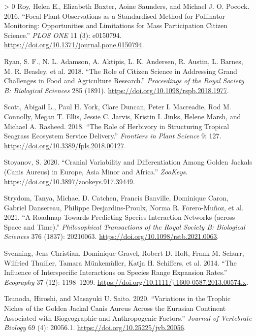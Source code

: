 \documentclass[10pt,oneside]{article}
\newlength{\cslhangindent}
\newenvironment{CSLReferences}[3] %
 {%
  \setlength{\parindent}{0pt}
  \ifodd #1 \everypar{\setlength{\hangindent}{\cslhangindent}}\ignorespaces\fi
  \ifnum #2 > 0
  \setlength{\parskip}{#2\baselineskip}
  \fi
 }%
 {}
\begin{document}
\begin{CSLReferences}{1}{0}
\leavevmode\hypertarget{ref-Roy2016FocPla}{}%
Roy, Helen E., Elizabeth Baxter, Aoine Saunders, and Michael J. O.
Pocock. 2016. {``Focal Plant Observations as a Standardised Method for
Pollinator Monitoring: Opportunities and Limitations for Mass
Participation Citizen Science.''} \emph{PLOS ONE} 11 (3): e0150794.
\url{https://doi.org/10.1371/journal.pone.0150794}.

\leavevmode\hypertarget{ref-Ryan2018RolCit}{}%
Ryan, S. F., N. L. Adamson, A. Aktipis, L. K. Andersen, R. Austin, L.
Barnes, M. R. Beasley, et al. 2018. {``The Role of Citizen Science in
Addressing Grand Challenges in Food and Agriculture Research.''}
\emph{Proceedings of the Royal Society B: Biological Sciences} 285
(1891). \url{https://doi.org/10.1098/rspb.2018.1977}.

\leavevmode\hypertarget{ref-Scott2018RolHer}{}%
Scott, Abigail L., Paul H. York, Clare Duncan, Peter I. Macreadie, Rod
M. Connolly, Megan T. Ellis, Jessie C. Jarvis, Kristin I. Jinks, Helene
Marsh, and Michael A. Rasheed. 2018. {``The Role of Herbivory in
Structuring Tropical Seagrass Ecosystem Service Delivery.''}
\emph{Frontiers in Plant Science} 9: 127.
\url{https://doi.org/10.3389/fpls.2018.00127}.

\leavevmode\hypertarget{ref-Stoyanov2020CraVar}{}%
Stoyanov, S. 2020. {``Cranial Variability and Differentiation Among
Golden Jackals (Canis Aureus) in Europe, Asia Minor and Africa.''}
\emph{ZooKeys}. \url{https://doi.org/10.3897/zookeys.917.39449}.

\leavevmode\hypertarget{ref-Strydom2021RoaPre}{}%
Strydom, Tanya, Michael D. Catchen, Francis Banville, Dominique Caron,
Gabriel Dansereau, Philippe Desjardins-Proulx, Norma R. Forero-Muñoz, et
al. 2021. {``A Roadmap Towards Predicting Species Interaction Networks
(across Space and Time).''} \emph{Philosophical Transactions of the
Royal Society B: Biological Sciences} 376 (1837): 20210063.
\url{https://doi.org/10.1098/rstb.2021.0063}.

\leavevmode\hypertarget{ref-Svenning2014InfInt}{}%
Svenning, Jens Christian, Dominique Gravel, Robert D. Holt, Frank M.
Schurr, Wilfried Thuiller, Tamara Münkemüller, Katja H. Schiffers, et
al. 2014. {``The Influence of Interspecific Interactions on Species
Range Expansion Rates.''} \emph{Ecography} 37 (12): 1198--1209.
\url{https://doi.org/10.1111/j.1600-0587.2013.00574.x}.

\leavevmode\hypertarget{ref-Tsunoda2020VarTro}{}%
Tsunoda, Hiroshi, and Masayuki U. Saito. 2020. {``Variations in the
Trophic Niches of the Golden Jackal Canis Aureus Across the Eurasian
Continent Associated with Biogeographic and Anthropogenic Factors.''}
\emph{Journal of Vertebrate Biology} 69 (4): 20056.1.
\url{https://doi.org/10.25225/jvb.20056}.


\end{CSLReferences}
\end{document}
